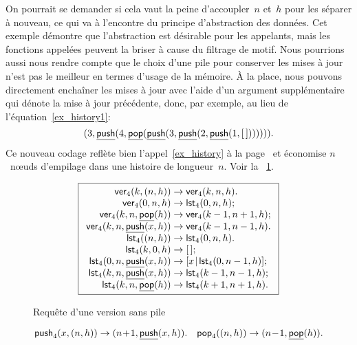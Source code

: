 On pourrait se demander si cela vaut la peine d'accoupler~\(n\)
et~\(h\) pour les séparer à nouveau, ce qui va à l'encontre du
principe d'abstraction des données. Cet exemple démontre que
l'abstraction est désirable pour les appelants, mais les fonctions
appelées peuvent la briser à cause du filtrage de motif. Nous
pourrions aussi nous rendre compte que le choix d'une pile pour
conserver les mises à jour n'est pas le meilleur en termes d'usage de
la mémoire. À la place, nous pouvons directement enchaîner les mises à
jour avec l'aide d'un argument supplémentaire qui dénote la mise à
jour précédente, donc, par exemple, au lieu de
l'équation~\eqref{ex_history1}:
\begin{equation*}
({3},{\underline{\textsf{push}}(4, \underline{\textsf{pop}}(\underline{\textsf{push}}(3, \underline{\textsf{push}}(2, \underline{\textsf{push}}(1,[\,])))))}).
\end{equation*}
Ce nouveau codage reflète
bien l'appel~\eqref{ex_history} à la page~\pageref{ex_history} et
économise \(n\)~n{\oe}uds d'empilage dans une histoire de
longueur~\(n\). Voir la \fig~\ref{fig_ver}.
\begin{figure}
\begin{equation*}
\boxed{%
\begin{array}{r@{\;}l@{\;}l}
\fun{ver}_4(k,\pair{n}{h}) & \rightarrow & \fun{ver}_4(k,n,h).\\
\fun{ver}_4(0,n,h) & \rightarrow & \fun{lst}_4(0,n,h);\\
\fun{ver}_4(k,n,\ufun{pop}(h))
                      & \rightarrow & \fun{ver}_4(k-1,n+1,h);\\
\fun{ver}_4(k,n,\ufun{push}(x,h))
                      & \rightarrow & \fun{ver}_4(k-1,n-1,h).\\
\fun{lst}_4(\pair{n}{h}) & \rightarrow & \fun{lst}_4(0,n,h).\\
\fun{lst}_4(k,0,h) & \rightarrow & \el;\\
\fun{lst}_4(0,n,\ufun{push}(x,h)) & \rightarrow
                      & \cons{x}{\fun{lst}_4(0,n-1,h)};\\
\fun{lst}_4(k,n,\ufun{push}(x,h)) & \rightarrow
                      & \fun{lst}_4(k-1,n-1,h);\\
\fun{lst}_4(k,n,\ufun{pop}(h)) & \rightarrow 
                      & \fun{lst}_4(k+1,n+1,h).
\end{array}}
\end{equation*}
\caption{Requête d'une version sans pile\label{fig_ver}}
\end{figure}
\begin{equation*}
\textsf{push}_4(x,({n},{h})) \rightarrow
({n\!+\!1},{\underline{\textsf{push}}(x,h)}).\quad
\textsf{pop}_4(({n},{h})) \rightarrow ({n\!-\!1},{\underline{\textsf{pop}}(h)}).
\end{equation*}

